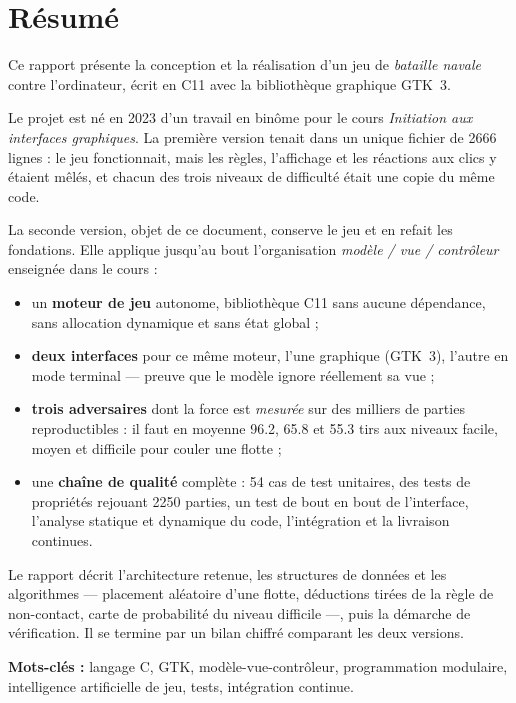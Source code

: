 \chapter*{Résumé}

Ce rapport présente la conception et la réalisation d'un jeu de \emph{bataille navale}
contre l'ordinateur, écrit en C11 avec la bibliothèque graphique GTK~3.

Le projet est né en 2023 d'un travail en binôme pour le cours \emph{Initiation aux interfaces
graphiques}. La première version tenait dans un unique fichier de \num{2666} lignes : le jeu
fonctionnait, mais les règles, l'affichage et les réactions aux clics y étaient mêlés, et
chacun des trois niveaux de difficulté était une copie du même code.

La seconde version, objet de ce document, conserve le jeu et en refait les fondations. Elle
applique jusqu'au bout l'organisation \emph{modèle / vue / contrôleur} enseignée dans le
cours :

\begin{itemize}
  \item un \textbf{moteur de jeu} autonome, bibliothèque C11 sans aucune dépendance, sans
        allocation dynamique et sans état global ;
  \item \textbf{deux interfaces} pour ce même moteur, l'une graphique (GTK~3), l'autre en
        mode terminal --- preuve que le modèle ignore réellement sa vue ;
  \item \textbf{trois adversaires} dont la force est \emph{mesurée} sur des milliers de
        parties reproductibles : il faut en moyenne \num{96.2}, \num{65.8} et \num{55.3}
        tirs aux niveaux facile, moyen et difficile pour couler une flotte ;
  \item une \textbf{chaîne de qualité} complète : 54 cas de test unitaires, des tests de
        propriétés rejouant \num{2250} parties, un test de bout en bout de l'interface,
        l'analyse statique et dynamique du code, l'intégration et la livraison continues.
\end{itemize}

Le rapport décrit l'architecture retenue, les structures de données et les algorithmes ---
placement aléatoire d'une flotte, déductions tirées de la règle de non-contact, carte de
probabilité du niveau difficile ---, puis la démarche de vérification. Il se termine par un
bilan chiffré comparant les deux versions.

\vspace{1.2em}
\noindent\textbf{Mots-clés :} langage C, GTK, modèle-vue-contrôleur, programmation
modulaire, intelligence artificielle de jeu, tests, intégration continue.

